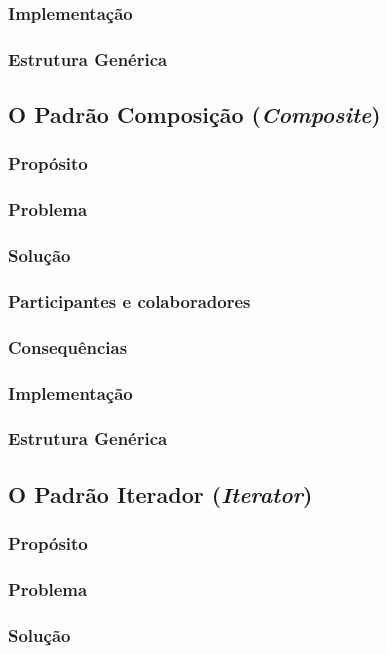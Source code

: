 \documentclass[
	11pt,				%
	openright,
	twoside,			%
	a4paper,			%
	english,			%
	french,
	brazil,				%
	sumario=tradicional
	]{abntex2}
\begin{document}
\subsubsection{Implementação}
\subsubsection{Estrutura Genérica}

\subsection{O Padrão Composição (\textit{Composite})}
\subsubsection{Propósito}
\subsubsection{Problema}
\subsubsection{Solução}
\subsubsection{Participantes e colaboradores}
\subsubsection{Consequências}
\subsubsection{Implementação}
\subsubsection{Estrutura Genérica}

\subsection{O Padrão Iterador (\textit{Iterator})}
\subsubsection{Propósito}
\subsubsection{Problema}
\subsubsection{Solução}
\end{document}
